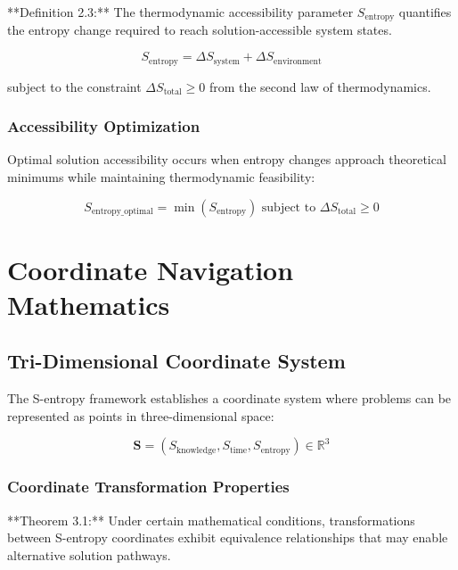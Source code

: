 \documentclass[11pt]{article}
\begin{document}
**Definition 2.3:** The thermodynamic accessibility parameter $S_{\text{entropy}}$ quantifies the entropy change required to reach solution-accessible system states.

\begin{equation}
S_{\text{entropy}} = \Delta S_{\text{system}} + \Delta S_{\text{environment}}
\label{eq:thermodynamic_accessibility}
\end{equation}

subject to the constraint $\Delta S_{\text{total}} \geq 0$ from the second law of thermodynamics.

\subsubsection{Accessibility Optimization}

Optimal solution accessibility occurs when entropy changes approach theoretical minimums while maintaining thermodynamic feasibility:

\begin{equation}
S_{\text{entropy\_optimal}} = \min\left(S_{\text{entropy}}\right) \text{ subject to } \Delta S_{\text{total}} \geq 0
\label{eq:entropy_optimization}
\end{equation}

\section{Coordinate Navigation Mathematics}

\subsection{Tri-Dimensional Coordinate System}

The S-entropy framework establishes a coordinate system where problems can be represented as points in three-dimensional space:

\begin{equation}
\mathbf{S} = (S_{\text{knowledge}}, S_{\text{time}}, S_{\text{entropy}}) \in \mathbb{R}^3
\label{eq:tri_dimensional_coordinates}
\end{equation}

\subsubsection{Coordinate Transformation Properties}

**Theorem 3.1:** Under certain mathematical conditions, transformations between S-entropy coordinates exhibit equivalence relationships that may enable alternative solution pathways.
\end{document}
